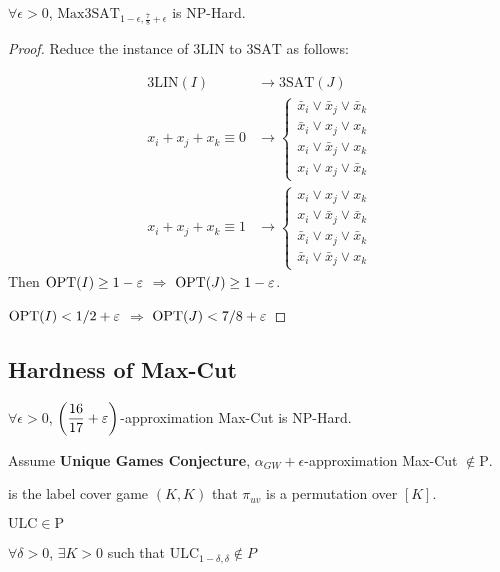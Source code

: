 \begin{corollary}
    $ \forall \epsilon>0 $,  $ \mathrm{Max3SAT}_{1-\epsilon,\frac{7}{8}+\epsilon} $ is NP-Hard.  
\end{corollary}
\begin{proof}
    Reduce the instance of  $ \mathrm{3LIN} $ to  $ \mathrm{3SAT} $ as follows:
    
    \begin{align*}
        \mathrm{3LIN}(I)&\rightarrow \mathrm{3SAT}(J)\\
        x_i+x_j+x_k\equiv0&\rightarrow \begin{cases}
            \bar{x}_i\vee\bar{x}_j\vee \bar{x}_k\\
            \bar{x}_i\vee x_j\vee x_k\\
            x_i\vee\bar{x}_j\vee x_k\\
            x_i\vee x_j\vee \bar{x}_k 
        \end{cases}\\
        x_i+x_j+x_k\equiv 1&\rightarrow \begin{cases}
            x_i\vee x_j\vee x_k\\
            x_i\vee \bar{x}_j\vee \bar{x}_k\\
            \bar{x}_i\vee x_j\vee \bar{x}_k\\
            \bar{x}_i\vee \bar{x}_j\vee x_k
        \end{cases}
    \end{align*}
    Then  $ \mathrm{OPT}(I) \geq 1-\varepsilon $  $ \Rightarrow  $  $ \mathrm{OPT}(J) \geq 1-\varepsilon $.
    
    $ \mathrm{OPT}(I)<1/2+\varepsilon $  $ \Rightarrow  $  $ \mathrm{OPT}(J)<7/8+\varepsilon $ 
\end{proof}

\subsection{Hardness of Max-Cut}
\begin{corollary}
    $ \forall \epsilon>0 $,  $ \displaystyle\left(\frac{16}{17}+\varepsilon\right) $-approximation Max-Cut is NP-Hard.
\end{corollary}
\begin{remark}\label{16/17 Hardness of Max-Cut}
    Assume \textbf{Unique Games Conjecture},  $ \alpha_{GW}+\epsilon $-approximation Max-Cut  $ \not\in \mathrm{P} $.  
\end{remark}

\begin{definition}
     is the label cover game $ (K,K) $  that  $ \pi_{uv} $ is a permutation over  $ [K] $.
\end{definition}
\begin{fact}
    $ \mathrm{ULC}\in \mathrm{P} $ 
\end{fact}
\begin{conjecture}
    $ \forall \delta>0 $,  $ \exists K>0 $ such that  $ \mathrm{ULC}_{1-\delta,\delta}\not\in P $   
\end{conjecture}

